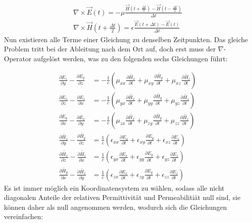 \documentclass[11pt, ngerman]{article}
\begin{document}
\begin{align}
	\nabla\times\vec{E}(t) = -\mu\frac{\vec{H}(t+\frac{\Delta t}{2})-\vec{H}(t-\frac{\Delta t}{2})}{\Delta t}\\
	\nabla\times\vec{H}(t + \frac{\Delta t}{2}) = \epsilon\frac{\vec{E}(t+\Delta t)-\vec{E}(t)}{\Delta t}
\end{align}
Nun existieren alle Terme einer Gleichung zu denselben Zeitpunkten. Das gleiche Problem tritt bei der Ableitung nach dem
Ort auf, doch erst muss der \(\nabla\)-Operator aufgel\"ost werden, was zu den folgenden sechs Gleichungen f\"uhrt:

\begin{align}
	\frac{\partial E_z}{\partial y} - \frac{\partial E_y}{\partial z} &= -\frac{1}{c}(\mu_{xx}\frac{\partial\widetilde{H_x}}{\partial t}
		+ \mu_{xy}\frac{\partial\widetilde{H_y}}{\partial t}
		+ \mu_{xz}\frac{\partial\widetilde{H_z}}{\partial t})\\
	\frac{\partial E_x}{\partial z} - \frac{\partial E_z}{\partial x} &= -\frac{1}{c}(\mu_{yx}\frac{\partial\widetilde{H_x}}{\partial t}
		+ \mu_{yy}\frac{\partial\widetilde{H_y}}{\partial t}
		+ \mu_{yz}\frac{\partial\widetilde{H_z}}{\partial t})\\
	\frac{\partial E_y}{\partial x} - \frac{\partial E_x}{\partial y} &= -\frac{1}{c}(\mu_{zx}\frac{\partial\widetilde{H_x}}{\partial t}
		+ \mu_{zy}\frac{\partial\widetilde{H_y}}{\partial t}
		+ \mu_{zz}\frac{\partial\widetilde{H_z}}{\partial t})\\
	\frac{\partial \widetilde{H_z}}{\partial y} - \frac{\partial\widetilde{H_y}}{\partial z} &= \frac{1}{c}(\epsilon_{xx}\frac{\partial E_x}{\partial t}
		+ \epsilon_{xy}\frac{\partial E_y}{\partial t}
		+ \epsilon_{xz}\frac{\partial E_z}{\partial t})\\
	\frac{\partial \widetilde{H_x}}{\partial z} - \frac{\partial \widetilde{H_z}}{\partial x} &= \frac{1}{c}(\epsilon_{yx}\frac{\partial E_x}{\partial t}
		+ \epsilon_{yy}\frac{\partial E_y}{\partial t}
		+ \epsilon_{yz}\frac{\partial E_z}{\partial t})\\
	\frac{\partial \widetilde{H_y}}{\partial x} - \frac{\partial\widetilde{H_x}}{\partial y} &= \frac{1}{c}(\epsilon_{zx}\frac{\partial E_x}{\partial t}
		+ \epsilon_{zy}\frac{\partial E_y}{\partial t}
		+ \epsilon_{zz}\frac{\partial E_z}{\partial t})
\end{align}
Es ist immer m\"oglich ein Koordinatensystem zu w\"ahlen, sodass alle nicht diagonalen Anteile der relativen Permittivit\"at und Permeabiliti\"at null sind,
sie k\"onnen daher als null angenommen werden, wodurch sich die Gleichungen vereinfachen\cite{diagonal_tensors}:
\end{document}
